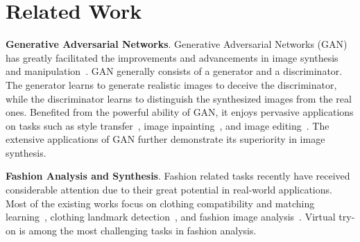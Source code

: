\documentclass[10pt,twocolumn,letterpaper]{article}
\begin{document}
\vspace{-5pt}
\section{Related Work}
\textbf{Generative Adversarial Networks}. Generative Adversarial Networks (GAN) has greatly facilitated the improvements and advancements in image synthesis~\cite{DBLP:conf/cvpr/IsolaZZE17,DBLP:conf/cvpr/Park0WZ19,DBLP:conf/iclr/KarrasALL18,DBLP:conf/cvpr/KarrasLA19} and manipulation~\cite{DBLP:journals/corr/abs-1902-06838,lee2019maskgan,DBLP:journals/corr/abs-1906-00884}. GAN generally consists of a generator and a discriminator. The generator learns to generate realistic images to deceive the discriminator, while the discriminator learns to distinguish the synthesized images from the real ones.
Benefited from the powerful ability of GAN, it enjoys pervasive applications on tasks such as style transfer~\cite{Zhu_2017_ICCV,DBLP:conf/cvpr/ChoiCKH0C18}, image inpainting~\cite{DBLP:conf/cvpr/XiongYLYLBL19,DBLP:journals/tog/IizukaS017,DBLP:journals/corr/abs-1806-03589,DBLP:conf/cvpr/Yu0YSLH18,liu2018image}, and image editing~\cite{DBLP:journals/corr/abs-1902-06838,DBLP:journals/corr/abs-1906-00884,lee2019maskgan,DBLP:conf/cvpr/Park0WZ19}. The extensive applications of GAN further demonstrate its superiority in image synthesis.


\textbf{Fashion Analysis and Synthesis}. Fashion related tasks recently have received considerable attention due to their great potential in real-world applications. Most of the existing works focus on clothing compatibility and matching learning~\cite{DBLP:journals/tmm/LiCZL17,DBLP:conf/ijcai/IwataWS11,DBLP:conf/iccv/VeitKBMBB15}, clothing landmark detection~\cite{liu2016fashion,yan2017unconstrained,ge2019deepfashion2,lee2019global}, and fashion image analysis~\cite{hsiao2019fashion++,han2019finet,liu2018deep}. Virtual try-on is among the most challenging tasks in fashion analysis.
\end{document}
